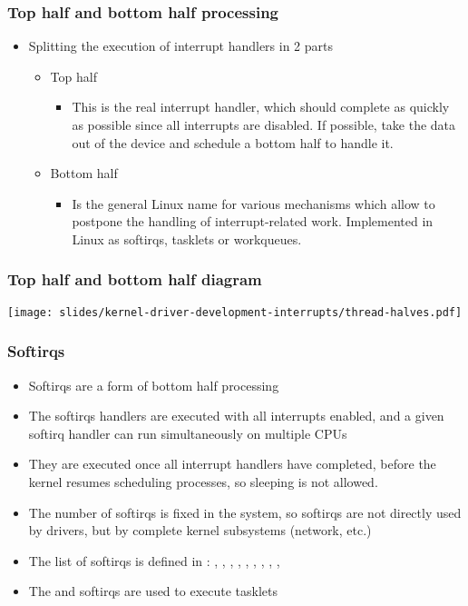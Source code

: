 \begin{frame}
  \frametitle{Top half and bottom half processing}
  \begin{itemize}
  \item Splitting the execution of interrupt handlers in 2 parts
    \begin{itemize}
    \item Top half
      \begin{itemize}
      \item This is the real interrupt handler, which should complete
        as quickly as possible since all interrupts are disabled. If
        possible, take the data out of the device and schedule a
        bottom half to handle it.
      \end{itemize}
    \item Bottom half
      \begin{itemize}
      \item Is the general Linux name for various mechanisms which
        allow to postpone the handling of interrupt-related
        work. Implemented in Linux as softirqs, tasklets or
        workqueues.
      \end{itemize}
    \end{itemize}
  \end{itemize}
\end{frame}

\begin{frame}
  \frametitle{Top half and bottom half diagram}
  \begin{center}
    \texttt{[image: slides/kernel-driver-development-interrupts/thread-halves.pdf]}
  \end{center}
\end{frame}

\begin{frame}
  \frametitle{Softirqs}
  \begin{itemize}
  \item Softirqs are a form of bottom half processing
  \item The softirqs handlers are executed with all interrupts
    enabled, and a given softirq handler can run simultaneously on
    multiple CPUs
  \item They are executed once all interrupt handlers have completed,
    before the kernel resumes scheduling processes, so sleeping is not
    allowed.
  \item The number of softirqs is fixed in the system, so softirqs are
    not directly used by drivers, but by complete kernel subsystems
    (network, etc.)
  \item The list of softirqs is defined in
    : , ,
    , , , ,
    , , , 
  \item The  and  softirqs are used to execute
    tasklets
  \end{itemize}
\end{frame}

